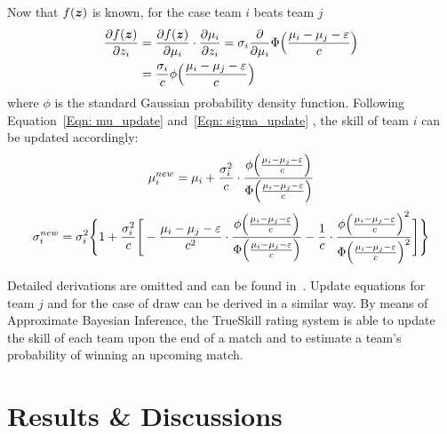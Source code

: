 Now that $f(\bm{z})$ is known, for the case team $i$ beats team $j$
\begin{equation}
\begin{split}
\frac{\partial f(\bm{z})}{\partial z_{i}} &= \frac{\partial f(\bm{z})}{\partial \mu_{i}} \cdot \frac{\partial \mu_{i}}{\partial z_{i}} = \sigma_{i}\frac{\partial}{\partial \mu_{i}}\Phi \Big{(} \frac{\mu_{i} - \mu_{j} - \varepsilon}{c}  \Big{)} \\
&= \frac{\sigma_{i}}{c} \phi \Big{(} \frac{\mu_{i} - \mu_{j} - \varepsilon}{c}  \Big{)}
\end{split}
\end{equation}
where $\phi$ is the standard Gaussian probability density function. Following Equation~\ref{Eqn: mu_update} and~\ref{Eqn: sigma_update} , the skill of team $i$ can be updated accordingly:
\begin{equation}
\mu_{i}^{new} = \mu_{i} + \frac{\sigma_{i}^{2}}{c} \cdot \frac{\phi \Big{(} \frac{\mu_{i} - \mu_{j} - \varepsilon}{c}  \Big{)}}{\Phi \Big{(} \frac{\mu_{i} - \mu_{j} - \varepsilon}{c}  \Big{)}}
\end{equation}
\begin{equation}
\sigma_{i}^{new} = \sigma_{i}^{2} 
\Bigg{\{} 
1 + \frac{\sigma_{i}^{2}}{c} 
\Bigg{[} 
-\frac{\mu_{i} - \mu_{j} - \varepsilon}{c^{2}} \cdot \frac{\phi \Big{(} \frac{\mu_{i} - \mu_{j} - \varepsilon}{c}  \Big{)}}{\Phi \Big{(} \frac{\mu_{i} - \mu_{j} - \varepsilon}{c}  \Big{)}}
-\frac{1}{c} \cdot  \frac{\phi \Big{(} \frac{\mu_{i} - \mu_{j} - \varepsilon}{c}  \Big{)}^{2}}{\Phi \Big{(} \frac{\mu_{i} - \mu_{j} - \varepsilon}{c}
 \Big{)}^{2}}
\Bigg{]}
\Bigg{\}}
\end{equation}

Detailed derivations are omitted and can be found in~\cite{RC11}. Update equations for team $j$ and for the case of draw can be derived in a similar way. By means of Approximate Bayesian Inference, the TrueSkill rating system is able to update the skill of each team upon the end of a match and to estimate a team's probability of winning an upcoming match. 

\section{Results \& Discussions}\label{Sec: imp}